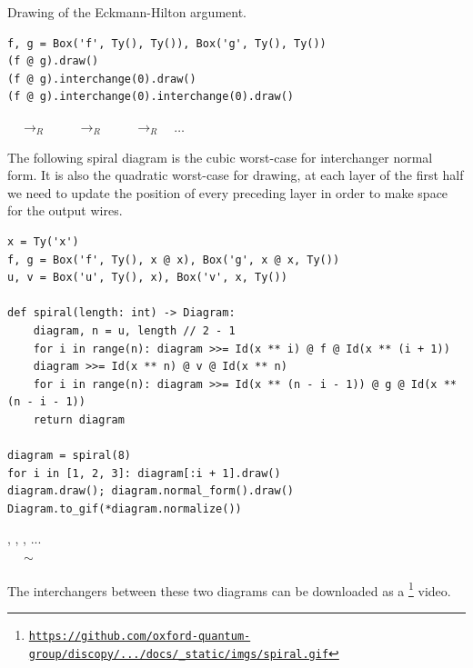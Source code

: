 \begin{example}
{\normalfont Drawing of the Eckmann-Hilton argument.}

\begin{verbatim}
f, g = Box('f', Ty(), Ty()), Box('g', Ty(), Ty())
(f @ g).draw()
(f @ g).interchange(0).draw()
(f @ g).interchange(0).interchange(0).draw()
\end{verbatim}

\begin{center}
$\quad \to_R \quad$ 
$\quad \to_R \quad$ 
$\quad \to_R \quad \dots$
\end{center}
\end{example}

\begin{example}\label{example:spiral}
The following spiral diagram is the cubic worst-case for interchanger normal form.
It is also the quadratic worst-case for drawing, at each layer of the first half we need to update the position of every preceding layer in order to make space for the output wires.

\begin{verbatim}
x = Ty('x')
f, g = Box('f', Ty(), x @ x), Box('g', x @ x, Ty())
u, v = Box('u', Ty(), x), Box('v', x, Ty())

def spiral(length: int) -> Diagram:
    diagram, n = u, length // 2 - 1
    for i in range(n): diagram >>= Id(x ** i) @ f @ Id(x ** (i + 1))
    diagram >>= Id(x ** n) @ v @ Id(x ** n)
    for i in range(n): diagram >>= Id(x ** (n - i - 1)) @ g @ Id(x ** (n - i - 1))
    return diagram

diagram = spiral(8)
for i in [1, 2, 3]: diagram[:i + 1].draw()
diagram.draw(); diagram.normal_form().draw()
Diagram.to_gif(*diagram.normalize())
\end{verbatim}
\begin{center}
,
,
, ... \\
\vspace{5pt}
 $\quad \sim \quad$
\end{center}

The interchangers between these two diagrams can be downloaded as a \footnote
{\href{https://github.com/oxford-quantum-group/discopy/blob/f364ce218890d87fda4aa5c1f4f770f07c7b4f25/docs/_static/imgs/spiral.gif}{\nolinkurl{https://github.com/oxford-quantum-group/discopy/.../docs/_static/imgs/spiral.gif}}} video.
\end{example}

